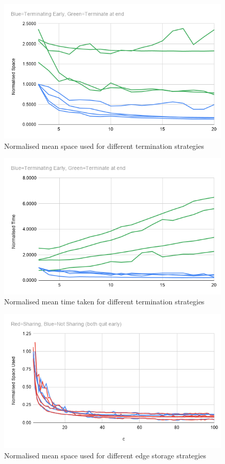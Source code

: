 \documentclass[11pt,twoside,a4paper]{report}
\begin{document}
\begin{figure}
	\label{Figure 1}
  \includegraphics[width=\textwidth]{img/terminationSpace.png}
	\caption{Normalised mean space used for different termination strategies}
\end{figure}
\begin{figure}
	\label{Figure 2}
  \includegraphics[width=\textwidth]{img/terminationTime.png}
	\caption{Normalised mean time taken for different termination strategies}
\end{figure}
\begin{figure}
	\label{Figure 3}
  \includegraphics[width=\textwidth]{img/edgeSpace.png}
	\caption{Normalised mean space used for different edge storage strategies}
\end{figure}
\end{document}
